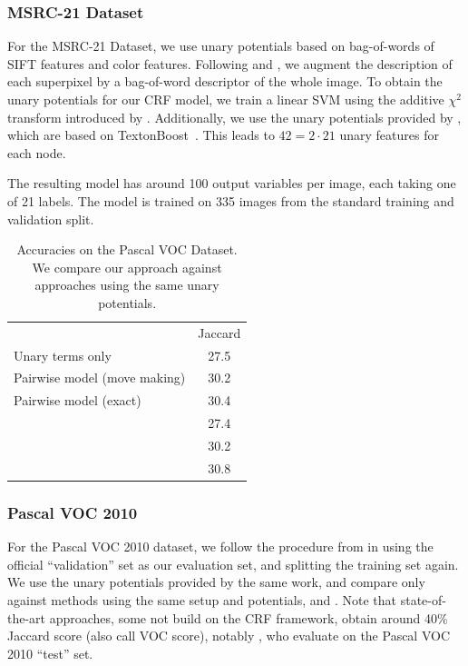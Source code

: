 \subsubsection{MSRC-21 Dataset}
For the MSRC-21 Dataset, we use unary potentials based on bag-of-words of SIFT
features and color features.  Following \citet{lucchi2011spatial} and
\citet{fulkerson2009class}, we augment the description of each superpixel by a
bag-of-word descriptor of the whole image. To obtain the unary potentials for
our CRF model, we train a linear SVM using the additive $\chi^2$ transform
introduced by \citet{vedaldi2010efficient}. Additionally, we use the unary
potentials provided by \citet{krahenbuhl2012efficient}, which are based on
TextonBoost~\citep{shotton2006textonboost}. This leads to $42 = 2 \cdot 21$
unary features for each node.

The resulting model has around 100 output variables per image, each taking one of 21
labels. The model is trained on 335 images from the standard training and
validation split.

\begin{table}
    \begin{center}
    \begin{tabular}{lc}
        \toprule
                    & Jaccard \\
        \cmidrule{1-2}
    Unary terms only &  27.5 \\
    Pairwise model (move making)& 30.2\\
    Pairwise model (exact) & 30.4\\
        \cmidrule{1-2}
    \citet{dann2012pottics} & 27.4\\
    \citet{krahenbuhl2012efficient} & 30.2\\
    \citet{krahenbuhlparameter} & 30.8\\
    \bottomrule
    \end{tabular}
    \end{center}
    \caption{Accuracies on the Pascal VOC Dataset. We compare our approach
    against approaches using the same unary potentials.\label{pascalacc}}
    
\end{table}


\subsubsection{Pascal VOC 2010}
For the Pascal VOC 2010 dataset, we follow the procedure from \citet{krahenbuhl2012efficient}
in using the official ``validation'' set as our evaluation set, and splitting the training set again.
We use the unary potentials provided by the same work, and compare only against methods
using the same setup and potentials, \citet{krahenbuhlparameter} and \citet{dann2012pottics}.
Note that state-of-the-art approaches, some not build on the CRF framework, obtain
around 40\% Jaccard score (also call VOC score), notably \cite{xia2012segmentation}, who 
evaluate on the Pascal VOC 2010 ``test'' set.


